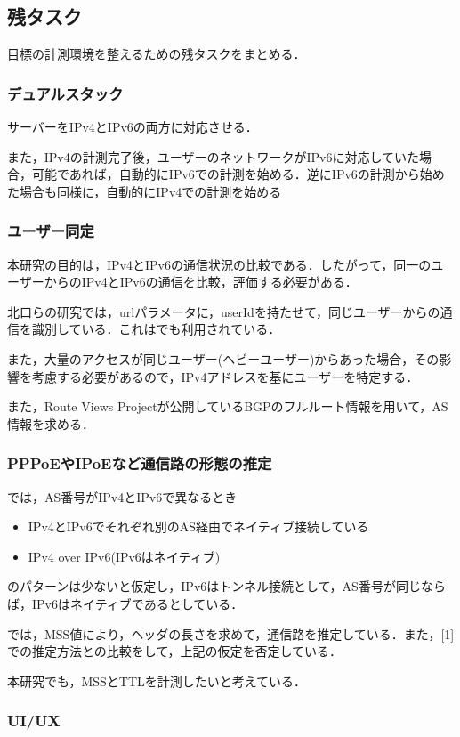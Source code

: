 \documentclass[rinkou,a4paper]{ieicej}
\begin{document}
\subsection{残タスク}
目標の計測環境を整えるための残タスクをまとめる．
\subsubsection{デュアルスタック}
サーバーをIPv4とIPv6の両方に対応させる．

また，IPv4の計測完了後，ユーザーのネットワークがIPv6に対応していた場合，可能であれば，自動的にIPv6での計測を始める．逆にIPv6の計測から始めた場合も同様に，自動的にIPv4での計測を始める
\subsubsection{ユーザー同定}
本研究の目的は，IPv4とIPv6の通信状況の比較である．したがって，同一のユーザーからのIPv4とIPv6の通信を比較，評価する必要がある．

北口らの研究\cite{kitaguchi1}では，urlパラメータに，userIdを持たせて，同じユーザーからの通信を識別している．これは\cite{kitaguchi2}でも利用されている．

また，大量のアクセスが同じユーザー(ヘビーユーザー)からあった場合，その影響を考慮する必要があるので，IPv4アドレスを基にユーザーを特定する．

また，Route Views Project\cite{routeview}が公開しているBGPのフルルート情報を用いて，AS情報を求める．

\subsubsection{PPPoEやIPoEなど通信路の形態の推定}
\cite{kitaguchi1}では，AS番号がIPv4とIPv6で異なるとき
\begin{itemize}
 \item IPv4とIPv6でそれぞれ別のAS経由でネイティブ接続している
 \item IPv4 over IPv6(IPv6はネイティブ)
\end{itemize}
のパターンは少ないと仮定し，IPv6はトンネル接続として，AS番号が同じならば，IPv6はネイティブであるとしている．

\cite{kitaguchi2}では，MSS値により，ヘッダの長さを求めて，通信路を推定している．また，[1]での推定方法との比較をして，上記の仮定を否定している．

本研究でも，MSSとTTLを計測したいと考えている．

\subsubsection{UI/UX}
\end{document}
